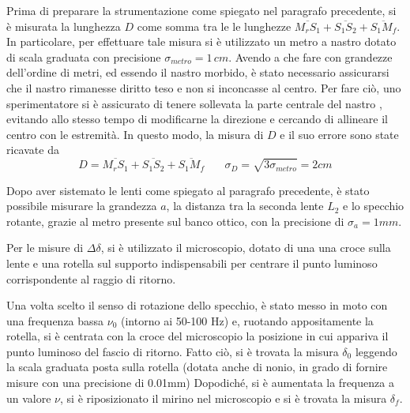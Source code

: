 Prima di preparare la strumentazione come spiegato nel paragrafo precedente, si è misurata la lunghezza $D$ come somma tra le le lunghezze $ \overline{M_rS_1}+\overline{S_1S_2}+\overline{S_1M_f}$. In particolare, per effettuare tale misura si è utilizzato un metro a nastro dotato di scala graduata con precisione $\sigma_{metro}=1\,cm$. Avendo a che fare con grandezze dell'ordine di metri, ed essendo il nastro morbido, è stato necessario assicurarsi che il nastro rimanesse diritto teso e non si inconcasse al centro. Per fare ciò, uno sperimentatore si è assicurato di tenere sollevata la parte centrale del nastro , evitando allo stesso tempo di modificarne la direzione e cercando di allineare il centro con le estremità.
In questo modo, la misura di $D$ e il suo errore sono state ricavate da
\begin{equation}
    D=\overline{M_rS_1}+\overline{S_1S_2}+\overline{S_1M_f} \, \, \, \, \, \, \, \, \, \, \, 
    \sigma_D=\sqrt{3\sigma_{metro}}=2cm
\end{equation}

Dopo aver sistemato le lenti come spiegato al paragrafo precedente, è stato possibile misurare la grandezza $a$, la distanza tra la seconda lente $L_2$ e lo specchio rotante, grazie al metro presente sul banco ottico, con la precisione di $\sigma_a=1mm$. 

Per le misure di $\Delta\delta$, si è utilizzato il microscopio, dotato di una una croce sulla lente e una rotella sul supporto indispensabili per centrare il punto luminoso corrispondente al raggio di ritorno. 

Una volta scelto il senso di rotazione dello specchio, è stato messo in moto con una frequenza bassa $\nu_0$ (intorno ai 50-100 Hz) e, ruotando appositamente la rotella, si è centrata con la croce del microscopio la posizione in cui appariva il punto luminoso del fascio di ritorno.  
Fatto ciò, si è trovata la misura $\delta_0$ leggendo la scala graduata posta sulla rotella (dotata anche di nonio, in grado di fornire misure con una precisione di 0.01mm)
Dopodiché, si è aumentata la frequenza a un valore $\nu$, si è riposizionato il mirino nel microscopio e si è trovata la misura $\delta_f$. 

